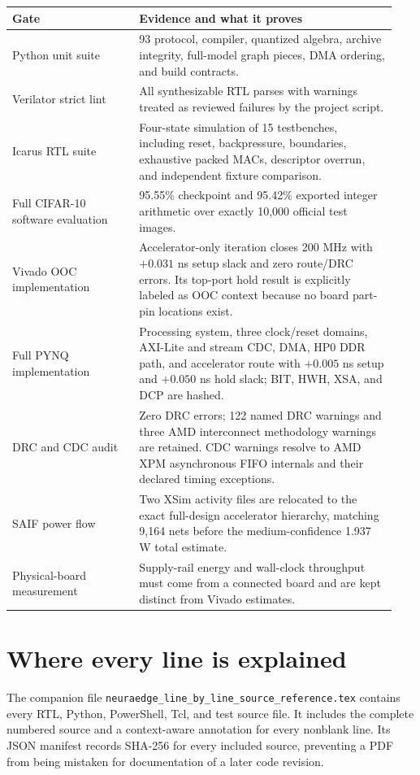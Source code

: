 \documentclass[10pt]{article}
\begin{document}
\begin{longtable}{p{0.31\linewidth}p{0.63\linewidth}}
\toprule
Gate & Evidence and what it proves\\
\midrule
\endhead
Python unit suite & 93 protocol, compiler, quantized algebra,
archive integrity, full-model graph pieces, DMA ordering, and build contracts.\\
Verilator strict lint & All synthesizable RTL parses with warnings treated as
reviewed failures by the project script.\\
Icarus RTL suite & Four-state simulation of 15 testbenches, including reset,
backpressure, boundaries, exhaustive packed MACs, descriptor overrun, and
independent fixture comparison.\\
Full CIFAR-10 software evaluation & 95.55\% checkpoint and 95.42\% exported
integer arithmetic over exactly 10,000 official test images.\\
Vivado OOC implementation & Accelerator-only iteration closes 200 MHz with
$+0.031$ ns setup slack and zero route/DRC errors. Its top-port hold result is
explicitly labeled as OOC context because no board part-pin locations exist.\\
Full PYNQ implementation & Processing system, three clock/reset domains,
AXI-Lite and stream CDC, DMA, HP0 DDR path, and accelerator route with
$+0.005$ ns setup and $+0.050$ ns hold slack; BIT, HWH, XSA, and DCP are hashed.\\
DRC and CDC audit & Zero DRC errors; 122 named DRC warnings and three AMD
interconnect methodology warnings are retained. CDC warnings resolve to AMD
XPM asynchronous FIFO internals and their declared timing exceptions.\\
SAIF power flow & Two XSim activity files are relocated to the exact full-design
accelerator hierarchy, matching 9,164 nets before the medium-confidence
1.937 W total estimate.\\
Physical-board measurement & Supply-rail energy and wall-clock throughput must
come from a connected board and are kept distinct from Vivado estimates.\\
\bottomrule
\end{longtable}

\section{Where every line is explained}

The companion file \texttt{neuraedge\_line\_by\_line\_source\_reference.tex}
contains every RTL, Python, PowerShell, Tcl, and test source file. It includes
the complete numbered source and a context-aware annotation for every nonblank
line. Its JSON manifest records SHA-256 for every included source, preventing a
PDF from being mistaken for documentation of a later code revision.
\end{document}
